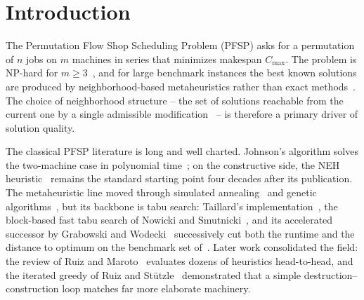 \documentclass[preprint,12pt,authoryear]{elsarticle}
\begin{document}
\section{Introduction}

The Permutation Flow Shop Scheduling Problem (PFSP) asks for a
permutation of $n$ jobs on $m$ machines in series that minimizes
makespan $C_{\max}$. The problem is NP-hard for
$m \geq 3$~\citep{garey76}, and for large benchmark instances the best
known solutions are produced by neighborhood-based metaheuristics
rather than exact methods~\citep{bozejko2010}. The choice of
neighborhood structure -- the set of solutions reachable from the
current one by a single admissible
modification~\citep{vanlaarhoven1992} -- is therefore a primary
driver of solution quality.

The classical PFSP literature is long and well charted. Johnson's
algorithm solves the two-machine case in polynomial
time~\citep{johnson54}; on the constructive side, the NEH
heuristic~\citep{neh83} remains the standard starting point four
decades after its publication. The metaheuristic line moved through
simulated annealing~\citep{osman89} and genetic
algorithms~\citep{reeves95}, but its backbone is tabu search:
Taillard's implementation~\citep{taillard90}, the block-based fast
tabu search of Nowicki and Smutnicki~\citep{nowicki96}, and its
accelerated successor by Grabowski and Wodecki~\citep{grabowski04}
successively cut both the runtime and the distance to optimum on the
benchmark set of~\citep{ref_taillard}. Later work consolidated the
field: the review of Ruiz and Maroto~\citep{ruizmaroto05} evaluates
dozens of heuristics head-to-head, and the iterated greedy of Ruiz and
St\"{u}tzle~\citep{ruizstutzle07} demonstrated that a simple
destruction--construction loop matches far more elaborate machinery.
\end{document}
